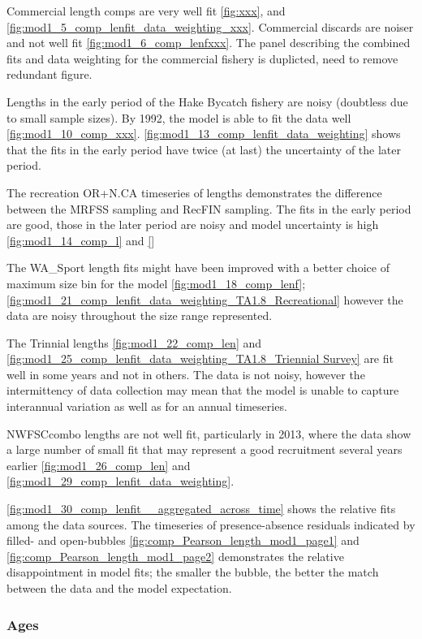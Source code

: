 \documentclass[12pt,]{article}
\begin{document}
Commercial length comps are very well fit \ref{fig:xxx}, and
\ref{fig:mod1_5_comp_lenfit_data_weighting_xxx}. Commercial discards are
noiser and not well fit \ref{fig:mod1_6_comp_lenfxxx}. The panel
describing the combined fits and data weighting for the commercial
fishery is duplicted, need to remove redundant figure.

Lengths in the early period of the Hake Bycatch fishery are noisy
(doubtless due to small sample sizes). By 1992, the model is able to fit
the data well \ref{fig:mod1_10_comp_xxx}.
\ref{fig:mod1_13_comp_lenfit_data_weighting} shows that the fits in the
early period have twice (at last) the uncertainty of the later period.

The recreation OR+N.CA timeseries of lengths demonstrates the difference
between the MRFSS sampling and RecFIN sampling. The fits in the early
period are good, those in the later period are noisy and model
uncertainty is high \ref{fig:mod1_14_comp_l} and \ref{}

The WA\_Sport length fits might have been improved with a better choice
of maximum size bin for the model \ref{fig:mod1_18_comp_lenf};
\ref{fig:mod1_21_comp_lenfit_data_weighting_TA1.8_Recreational} however
the data are noisy throughout the size range represented.

The Trinnial lengths \ref{fig:mod1_22_comp_len} and
\ref{fig:mod1_25_comp_lenfit_data_weighting_TA1.8_Triennial Survey} are
fit well in some years and not in others. The data is not noisy, however
the intermittency of data collection may mean that the model is unable
to capture interannual variation as well as for an annual timeseries.

NWFSCcombo lengths are not well fit, particularly in 2013, where the
data show a large number of small fit that may represent a good
recruitment several years earlier \ref{fig:mod1_26_comp_len} and
\ref{fig:mod1_29_comp_lenfit_data_weighting}.

\ref{fig:mod1_30_comp_lenfit__aggregated_across_time} shows the relative
fits among the data sources. The timeseries of presence-absence
residuals indicated by filled- and open-bubbles
\ref{fig:comp_Pearson_length_mod1_page1} and
\ref{fig:comp_Pearson_length_mod1_page2} demonstrates the relative
disappointment in model fits; the smaller the bubble, the better the
match between the data and the model expectation.

\subsubsection{Ages}\label{ages}
\end{document}

